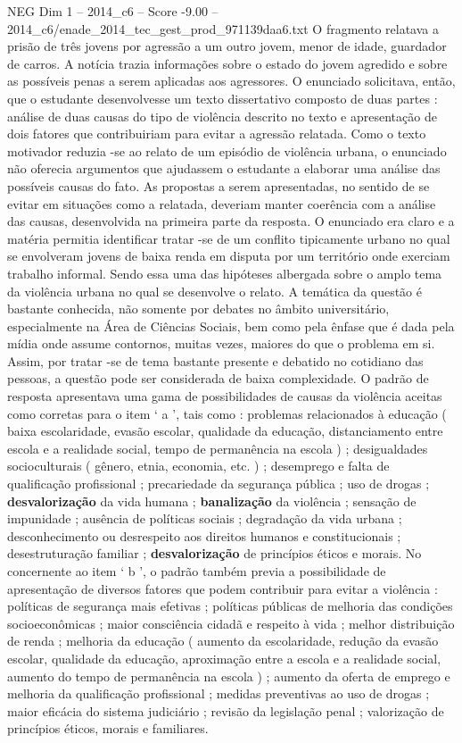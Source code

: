 \begin{textsample}{NEG Dim 1 – 2014\_c6 – Score -9.00 – 2014\_c6/enade\_2014\_tec\_gest\_prod\_971139daa6.txt}
O fragmento relatava a prisão de três jovens por agressão a um outro jovem, menor de idade, guardador de carros.
A notícia trazia informações sobre o estado do jovem agredido e sobre as possíveis penas a serem aplicadas aos agressores.
O enunciado solicitava, então, que o estudante desenvolvesse um texto dissertativo composto de duas partes : análise de duas causas do tipo de violência descrito no texto e apresentação de dois fatores que contribuiriam para evitar a agressão relatada.
Como o texto motivador reduzia -se ao relato de um episódio de violência urbana, o enunciado não oferecia argumentos que ajudassem o estudante a elaborar uma análise das possíveis causas do fato.
As propostas a serem apresentadas, no sentido de se evitar em situações como a relatada, deveriam manter coerência com a análise das causas, desenvolvida na primeira parte da resposta.
O enunciado era claro e a matéria permitia identificar tratar -se de um conflito tipicamente urbano no qual se envolveram jovens de baixa renda em disputa por um território onde exerciam trabalho informal.
Sendo essa uma das hipóteses albergada sobre o amplo tema da violência urbana no qual se desenvolve o relato.
A temática da questão é bastante conhecida, não somente por debates no âmbito universitário, especialmente na Área de Ciências Sociais, bem como pela ênfase que é dada pela mídia onde assume contornos, muitas vezes, maiores do que o problema em si.
Assim, por tratar -se de tema bastante presente e debatido no cotidiano das pessoas, a questão pode ser considerada de baixa complexidade.
O padrão de resposta apresentava uma gama de possibilidades de causas da violência aceitas como corretas para o item ‘ a ’, tais como : problemas relacionados à educação ( baixa escolaridade, evasão escolar, qualidade da educação, distanciamento entre escola e a realidade social, tempo de permanência na escola ) ; desigualdades socioculturais ( gênero, etnia, economia, etc. ) ; desemprego e falta de qualificação profissional ; precariedade da segurança pública ; uso de drogas ; \textbf{desvalorização} da vida humana ; \textbf{banalização} da violência ; sensação de impunidade ; ausência de políticas sociais ; degradação da vida urbana ; desconhecimento ou desrespeito aos direitos humanos e constitucionais ; desestruturação familiar ; \textbf{desvalorização} de princípios éticos e morais.
No concernente ao item ‘ b ’, o padrão também previa a possibilidade de apresentação de diversos fatores que podem contribuir para evitar a violência : políticas de segurança mais efetivas ; políticas públicas de melhoria das condições socioeconômicas ; maior consciência cidadã e respeito à vida ; melhor distribuição de renda ; melhoria da educação ( aumento da escolaridade, redução da evasão escolar, qualidade da educação, aproximação entre a escola e a realidade social, aumento do tempo de permanência na escola ) ; aumento da oferta de emprego e melhoria da qualificação profissional ; medidas preventivas ao uso de drogas ; maior eficácia do sistema judiciário ; revisão da legislação penal ; valorização de princípios éticos, morais e familiares.

\end{textsample}
